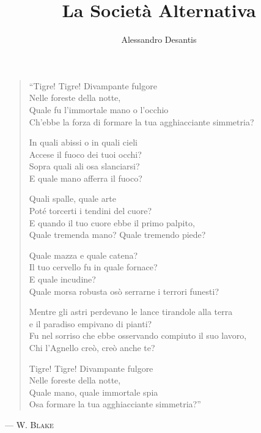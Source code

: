 \documentclass[a4paper,10pt]{memoir}
\title{La Società Alternativa}
\author{Alessandro Desantis}
\date{}
\begin{document}
\begin{titlingpage}
\maketitle
\end{titlingpage}

\clearpage
\thispagestyle{empty}

\begin{verse}
\itshape{
``Tigre! Tigre! Divampante fulgore\\
Nelle foreste della notte,\\
Quale fu l'immortale mano o l'occhio\\
Ch'ebbe la forza di formare la tua agghiacciante simmetria?

In quali abissi o in quali cieli\\
Accese il fuoco dei tuoi occhi?\\
Sopra quali ali osa slanciarsi?\\
E quale mano afferra il fuoco?

Quali spalle, quale arte\\
Poté torcerti i tendini del cuore?\\
E quando il tuo cuore ebbe il primo palpito,\\
Quale tremenda mano? Quale tremendo piede?

Quale mazza e quale catena?\\
Il tuo cervello fu in quale fornace?\\
E quale incudine?\\
Quale morsa robusta osò serrarne i terrori funesti?

Mentre gli astri perdevano le lance tirandole alla terra\\
e il paradiso empivano di pianti?\\
Fu nel sorriso che ebbe osservando compiuto il suo lavoro,\\
Chi l'Agnello creò, creò anche te?

Tigre! Tigre! Divampante fulgore\\
Nelle foreste della notte,\\
Quale mano, quale immortale spia\\
Osa formare la tua agghiacciante simmetria?''
\/}
\end{verse}

\begin{flushright}
--- \scshape{W. Blake}
\end{flushright}
\end{document}

